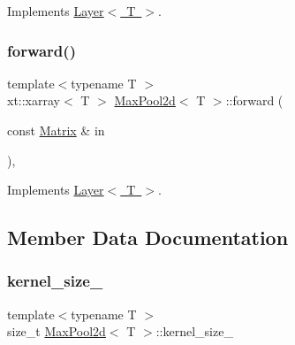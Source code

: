 Implements \mbox{\hyperlink{class_layer_ac4c13a3a85bfdd4d7d4d18669e3299fe}{Layer$<$ T $>$}}.

\mbox{\label{class_max_pool2d_a424de7878c64a058a8549362dae448f0}} 
\subsubsection{\texorpdfstring{forward()}{forward()}}
{\footnotesize\ttfamily template$<$typename T $>$ \\
xt\+::xarray$<$ T $>$ \mbox{\hyperlink{class_max_pool2d}{Max\+Pool2d}}$<$ T $>$\+::forward (\begin{DoxyParamCaption}\item[{const \mbox{\hyperlink{class_layer_a22b1e7286096aa62bd245536c8ebdaf1}{Matrix}} \&}]{in }\end{DoxyParamCaption})\hspace{0.3cm}{\ttfamily [override]}, {\ttfamily [virtual]}}



Implements \mbox{\hyperlink{class_layer_ab15b665c86974b1cf1d7ba4e309cb0e5}{Layer$<$ T $>$}}.



\subsection{Member Data Documentation}
\mbox{\label{class_max_pool2d_a665aa0f6561a8a7883d2746efeb68f88}} 
\subsubsection{\texorpdfstring{kernel\_size\_}{kernel\_size\_}}
{\footnotesize\ttfamily template$<$typename T $>$ \\
size\+\_\+t \mbox{\hyperlink{class_max_pool2d}{Max\+Pool2d}}$<$ T $>$\+::kernel\+\_\+size\+\_\+\hspace{0.3cm}{\ttfamily [protected]}}

\mbox{\label{class_max_pool2d_ab1dd4757718ee42e14bb7fdcf2a2be2c}} 
